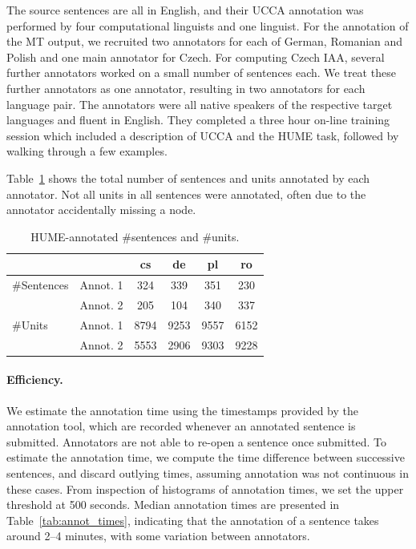 \documentclass[11pt,letterpaper]{article}
\newcommand{\tabref}[1]{Table~\ref{#1}}
\begin{document}
The source sentences are all in English, and their UCCA annotation was performed by four
computational linguists and one linguist.
For the annotation of the MT output, we recruited two annotators for each of German, Romanian
and Polish and one main annotator for Czech. For computing Czech IAA,
several further annotators worked on a small number of 
sentences each. We treat these further annotators as one annotator, resulting in two annotators
for each language pair.
The annotators were all native speakers of the respective target languages and fluent in English.
They completed a three hour on-line training session which included a description of
UCCA and the HUME task, followed by walking through a few examples. 


\tabref{tab:annot}
shows the total number of sentences and units annotated by each annotator.
Not all units in all sentences were annotated, often due to
the annotator %
accidentally missing a node.
\begin{table}
\begin{center}
{\small
\begin{tabular}{ll|cccc}
& & cs & de & pl & ro \\
\hline
\#Sentences &  Annot. 1 & 324   & 339  & 351  & 230  \\
 & Annot. 2 & 205 & 104  & 340  & 337 \\
\hline
\#Units & Annot. 1 & 8794  & 9253 & 9557  & 6152 \\
 &Annot. 2 & 5553 & 2906  & 9303  & 9228  \\
\end{tabular}
\caption{HUME-annotated \#sentences and \#units.}
\label{tab:annot}
}
\end{center}
\end{table}

\paragraph{Efficiency.}
We estimate the annotation time using the timestamps
provided by the annotation tool, which are recorded whenever an annotated sentence is
submitted. Annotators are not able to re-open a sentence once submitted. 
To estimate the annotation time, we compute the time difference between successive 
sentences, and discard outlying times, assuming annotation was not continuous in these cases.
From inspection of histograms of annotation times, we set the upper threshold at 500 seconds.
Median annotation times are presented in Table~\ref{tab:annot_times},
indicating that the annotation
of a sentence takes around 2--4 minutes, with some variation between annotators.
\end{document}

